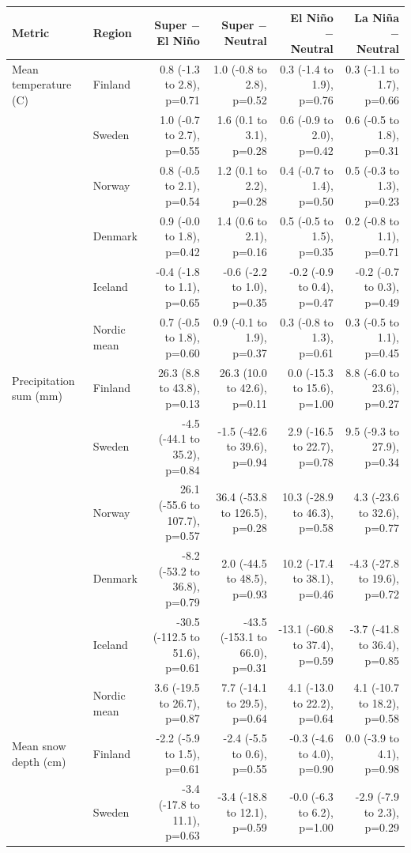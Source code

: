 \begin{tabular}{llrrrr}
\toprule
Metric & Region & Super $-$ El Niño & Super $-$ Neutral & El Niño $-$ Neutral & La Niña $-$ Neutral \\
\midrule
Mean temperature (\textdegree{}C) & Finland & 0.8 (-1.3 to 2.8), p=0.71 & 1.0 (-0.8 to 2.8), p=0.52 & 0.3 (-1.4 to 1.9), p=0.76 & 0.3 (-1.1 to 1.7), p=0.66 \\
 & Sweden & 1.0 (-0.7 to 2.7), p=0.55 & 1.6 (0.1 to 3.1), p=0.28 & 0.6 (-0.9 to 2.0), p=0.42 & 0.6 (-0.5 to 1.8), p=0.31 \\
 & Norway & 0.8 (-0.5 to 2.1), p=0.54 & 1.2 (0.1 to 2.2), p=0.28 & 0.4 (-0.7 to 1.4), p=0.50 & 0.5 (-0.3 to 1.3), p=0.23 \\
 & Denmark & 0.9 (-0.0 to 1.8), p=0.42 & 1.4 (0.6 to 2.1), p=0.16 & 0.5 (-0.5 to 1.5), p=0.35 & 0.2 (-0.8 to 1.1), p=0.71 \\
 & Iceland & -0.4 (-1.8 to 1.1), p=0.65 & -0.6 (-2.2 to 1.0), p=0.35 & -0.2 (-0.9 to 0.4), p=0.47 & -0.2 (-0.7 to 0.3), p=0.49 \\
 & Nordic mean & 0.7 (-0.5 to 1.8), p=0.60 & 0.9 (-0.1 to 1.9), p=0.37 & 0.3 (-0.8 to 1.3), p=0.61 & 0.3 (-0.5 to 1.1), p=0.45 \\
\addlinespace
Precipitation sum (mm) & Finland & 26.3 (8.8 to 43.8), p=0.13 & 26.3 (10.0 to 42.6), p=0.11 & 0.0 (-15.3 to 15.6), p=1.00 & 8.8 (-6.0 to 23.6), p=0.27 \\
 & Sweden & -4.5 (-44.1 to 35.2), p=0.84 & -1.5 (-42.6 to 39.6), p=0.94 & 2.9 (-16.5 to 22.7), p=0.78 & 9.5 (-9.3 to 27.9), p=0.34 \\
 & Norway & 26.1 (-55.6 to 107.7), p=0.57 & 36.4 (-53.8 to 126.5), p=0.28 & 10.3 (-28.9 to 46.3), p=0.58 & 4.3 (-23.6 to 32.6), p=0.77 \\
 & Denmark & -8.2 (-53.2 to 36.8), p=0.79 & 2.0 (-44.5 to 48.5), p=0.93 & 10.2 (-17.4 to 38.1), p=0.46 & -4.3 (-27.8 to 19.6), p=0.72 \\
 & Iceland & -30.5 (-112.5 to 51.6), p=0.61 & -43.5 (-153.1 to 66.0), p=0.31 & -13.1 (-60.8 to 37.4), p=0.59 & -3.7 (-41.8 to 36.4), p=0.85 \\
 & Nordic mean & 3.6 (-19.5 to 26.7), p=0.87 & 7.7 (-14.1 to 29.5), p=0.64 & 4.1 (-13.0 to 22.2), p=0.64 & 4.1 (-10.7 to 18.2), p=0.58 \\
\addlinespace
Mean snow depth (cm) & Finland & -2.2 (-5.9 to 1.5), p=0.61 & -2.4 (-5.5 to 0.6), p=0.55 & -0.3 (-4.6 to 4.0), p=0.90 & 0.0 (-3.9 to 4.1), p=0.98 \\
 & Sweden & -3.4 (-17.8 to 11.1), p=0.63 & -3.4 (-18.8 to 12.1), p=0.59 & -0.0 (-6.3 to 6.2), p=1.00 & -2.9 (-7.9 to 2.3), p=0.29 \\

\end{tabular}
